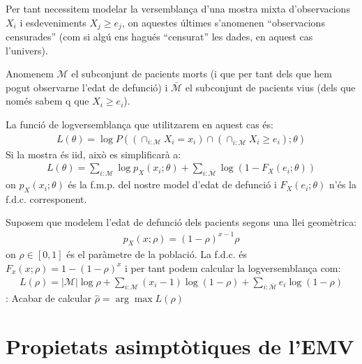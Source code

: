 \documentclass[letterpaper,10pt,english]{sphinxmanual}
\begin{document}
Per tant necessitem modelar la versemblança d’una mostra
mixta d’observacions \(X_i\) i esdeveniments \(X_j \geq e_j\),
on aquestes últimes s’anomenen “observacions censurades” (com
si algú ens hagués “censurat” les dades, en aquest cas l’univers).

Anomenem \(\mathcal{M}\) el subconjunt
de pacients morts (i que per tant dels que hem pogut observar\sphinxhyphen{}ne l’edat de defunció)
i \(\bar{\mathcal{M}}\) el subconjunt de pacients vius (dels que només sabem q
que \(X_i \geq e_i\)).

La funció de log\sphinxhyphen{}versemblança
que utilitzarem en aquest cas és:
\begin{equation*}
\begin{split}L(\theta) = \log P\left(\left( \cap_{i: \mathcal{M}}{ X_i=x_i} \right) \cap \left(\cap_{i: \bar{\mathcal{M}}}{ X_i \geq e_i}\right); \theta \right)\end{split}
\end{equation*}
Si la mostra és iid, això es simplificarà a:
\begin{equation*}
\begin{split}L(\theta) = \sum_{i: \mathcal{M}}\log p_X(x_i; \theta) + \sum_{i: \bar{\mathcal{M}}} \log(1 -  F_X(e_i; \theta))\end{split}
\end{equation*}
on \(p_X(x_i; \theta)\) és la f.m.p. del nostre model d’edat de defunció i \(F_X(e_i; \theta)\) n’és la f.d.c. corresponent.

Suposem que modelem l’edat de defunció dels pacients segons una llei geomètrica:
\begin{equation*}
\begin{split}p_X(x; \rho) = (1 - \rho)^{x - 1} \rho\end{split}
\end{equation*}
on \(\rho \in [0, 1]\) és el paràmetre de la població.
La f.d.c. és \(F_x(x ;\rho) = 1 - (1 -\rho)^x\)
i per tant podem calcular la log\sphinxhyphen{}versemblança com:
\begin{equation*}
\begin{split}L(\rho) = \left|\mathcal{M}\right| \log \rho + \sum_{i: \mathcal{M}}(x_i -1) \log(1 -\rho) + \sum_{i: \bar{\mathcal{M}}}e_i \log(1 -  \rho)\end{split}
\end{equation*}
: Acabar de calcular \(\hat{\rho} = \arg \max  L(\rho)\)


\section{Propietats asimptòtiques de l’EMV}
\label{\detokenize{0_Intro/0_3_Estimacio:propietats-asimptotiques-de-l-emv}}
\end{document}
